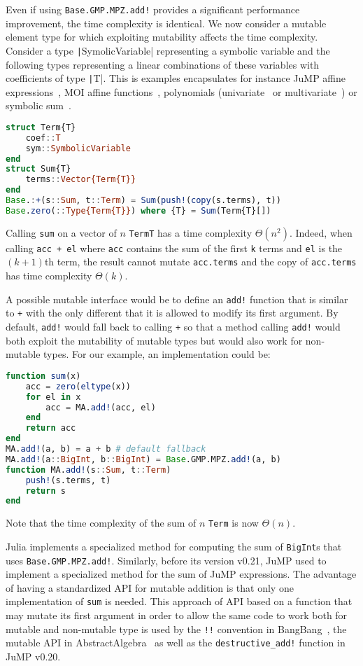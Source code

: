 \documentclass{juliacon}
\begin{document}
Even if using \lstinline|Base.GMP.MPZ.add!| provides a significant performance improvement,
the time complexity is identical.
We now consider a mutable element type for which exploiting mutability affects the time complexity.
Consider a type \texttt|SymolicVariable| representing a symbolic variable and the following types representing a linear combinations of these variables with coefficients of type \texttt|T|.
This is examples encapsulates for instance JuMP affine expressions~\cite{dunning2017jump}, MOI affine functions~\cite{legat2021mathoptinterface}, polynomials (univariate~\cite{verzani2021polynomials} or multivariate~\cite{legat2021multivariatepolynomials}) or symbolic sum~\cite{gowda2021high}.
\begin{lstlisting}[language = Julia]
struct Term{T}
    coef::T
    sym::SymbolicVariable
end
struct Sum{T}
    terms::Vector{Term{T}}
end
Base.:+(s::Sum, t::Term) = Sum(push!(copy(s.terms), t))
Base.zero(::Type{Term{T}}) where {T} = Sum(Term{T}[])
\end{lstlisting}
Calling \texttt{sum} on a vector of $n$ \texttt{Term{T}} has a time complexity $\Theta(n^2)$.
Indeed, when calling \lstinline|acc + el| where \lstinline|acc| contains the sum of the first \lstinline|k| terms and \lstinline|el| is the $(k+1)$th term,
the result cannot mutate \lstinline|acc.terms| and the copy of \lstinline|acc.terms| has time complexity $\Theta(k)$.

A possible mutable interface would be to define an \lstinline|add!| function
that is similar to \lstinline|+| with the only different that it
is allowed to modify its first argument.
By default, \lstinline|add!| would fall back to calling \lstinline|+|
so that a method calling \lstinline|add!| would both exploit the mutability
of mutable types but would also work for non-mutable types.
For our example, an implementation could be:
\begin{lstlisting}[language = Julia]
function sum(x)
    acc = zero(eltype(x))
    for el in x
        acc = MA.add!(acc, el)
    end
    return acc
end
MA.add!(a, b) = a + b # default fallback
MA.add!(a::BigInt, b::BigInt) = Base.GMP.MPZ.add!(a, b)
function MA.add!(s::Sum, t::Term)
    push!(s.terms, t)
    return s
end
\end{lstlisting}
Note that the time complexity of the sum of $n$ \lstinline|Term| is now $\Theta(n)$.

Julia implements a specialized method for computing the sum of \lstinline|BigInt|s that uses \lstinline|Base.GMP.MPZ.add!|.
Similarly, before its version v0.21, JuMP used to implement a specialized method for the sum of JuMP expressions.
The advantage of having a standardized API for mutable addition is that
only one implementation of \lstinline|sum| is needed.
This approach of API based on a function that may mutate its first argument in order to allow the same code to work both for mutable and non-mutable type is
used by the \lstinline|!!| convention in BangBang~\cite{takafumi2021bangbang},
the mutable API in AbstractAlgebra~\cite{AbstractAlgebra.jl-2017}
as well as the \lstinline|destructive_add!| function in JuMP v0.20.
\end{document}
